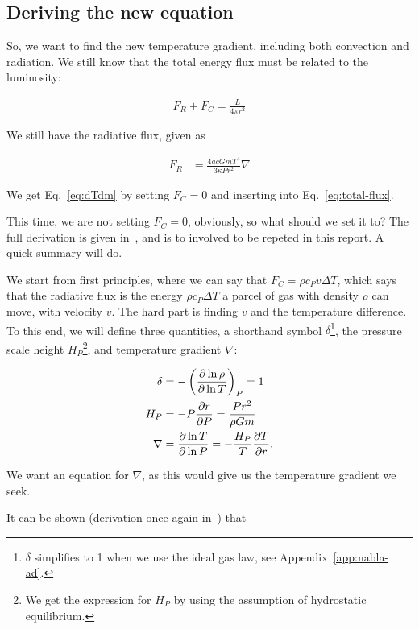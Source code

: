 \documentclass[11pt,twocolumn]{article}
\begin{document}
\subsection{Deriving the new equation}

So, we want to find the new temperature gradient, including both convection and radiation. We still know that the total energy flux must be related to the luminosity:

\begin{align}
    F_R + F_C = \frac{L}{4\pi r^2}\label{eq:total-flux}
\end{align}

We still have the radiative flux, given as

\begin{align}
    F_R &= \frac{4acGmT^4}{3\kappa P r^2}\nabla \label{eq:radiative-flux}
\end{align}

We get Eq.~\eqref{eq:dTdm} by setting $F_C = 0$ and inserting into Eq.~\eqref{eq:total-flux}.

This time, we are not setting $F_C = 0$, obviously, so what should we set it to? The full derivation is given in~\cite{lecture-notes}, and is to involved to be repeted in this report. A quick summary will do.

We start from first principles, where we can say that $F_C = \rho c_P v \Delta T$, which says that the radiative flux is the energy $\rho c_P \Delta T$ a parcel of gas with density $\rho$ can move, with velocity $v$. The hard part is finding $v$ and the temperature difference. To this end, we will define three quantities, a shorthand symbol $\delta$\footnote{$\delta$ simplifies to 1 when we use the ideal gas law, see Appendix~\ref{app:nabla-ad}.}, the pressure scale height $H_P$\footnote{We get the expression for $H_P$ by using the assumption of hydrostatic equilibrium.}, and temperature gradient $\nabla $:

\begin{align}
    \delta &= -\left( \frac{\partial \ln \rho}{\partial \ln T} \right)_P=1\label{eq:delta-def}\\
    H_P &= -P\frac{\partial r}{\partial P} = \frac{P r^2}{\rho Gm} \label{eq:Hp-def}\\
    \nabla &= \frac{\partial \ln T}{\partial \ln P} = -\frac{H_P}{T}\frac{\partial T}{\partial r}\label{eq:grad-def}.
\end{align}

We want an equation for $\nabla$, as this would give us the temperature gradient we seek.

It can be shown (derivation once again in~\cite{lecture-notes}) that
\end{document}
